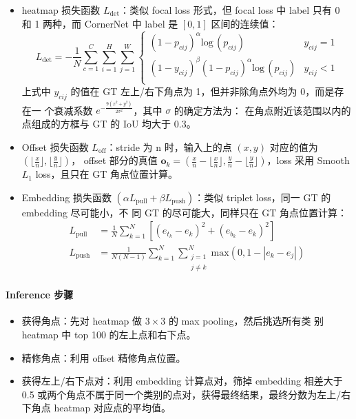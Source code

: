 \begin{itemize}
  \item heatmap 损失函数 $L_{\mathrm{det}}$：类似 focal loss 形式，但 focal loss
    中 label 只有 0 和 1 两种，而 CornerNet 中 label 是 $[0, 1]$ 区间的连续值：
    \begin{equation}
      \label{equ:cornernet-det-loss}
      L_{\mathrm{det}} = -\frac{1}{N} \sum_{c=1}^{C} \sum_{i=1}^{H} \sum_{j=1}^{W}
      \left\{
        \begin{array}{lr}
           (1-p_{cij})^{\alpha}\mathrm{log}\,(p_{cij}) & y_{cij} = 1 \\
           (1-y_{cij})^{\beta} (1-p_{cij})^{\alpha} \mathrm{log}\,(p_{cij}) & y_{cij} < 1 \\
        \end{array}
      \right.
    \end{equation}
    上式中 $y_{cij}$ 的值在 GT 左上/右下角点为 1，但并非除角点外均为 0，而是存在一
    个衰减系数 $e^{-\frac{9(x^2+y^2)}{2\sigma^2}}$，其中 $\sigma$ 的确定方法为：
    在角点附近该范围以内的点组成的方框与 GT 的 IoU 均大于 0.3。
  \item Offset 损失函数 $L_{\mathrm{off}}$：stride 为 n 时，输入上的点 $(x, y)$
    对应的值为 $( \lfloor \frac{x}{n} \rfloor, \lfloor \frac{y}{n} \rfloor)$，
    offset 部分的真值 $\mathbf{o}_k = \left( \frac{x}{n} - \lfloor \frac{x}{n}
      \rfloor, \frac{y}{n} - \lfloor \frac{y}{n} \rfloor \right)$，loss 采用
    Smooth $L_1$ loss，且只在 GT 角点位置计算。
  \item Embedding 损失函数 $(\alpha L_{\mathrm{pull}} + \beta
    L_{\mathrm{push}})$：类似 triplet loss，同一 GT 的 embedding 尽可能小，不
    同 GT 的尽可能大，同样只在 GT 角点位置计算：
    \begin{align}
      \label{equ:cornernet-em-loss-pull}
      L_{\mathrm{pull}} & = \frac{1}{N} \sum_{k=1}^{N} \left[ (e_{t_k} - e_k)^2 + (e_{b_k} - e_k)^2 \right] \\
      \label{equ:cornernet-em-loss-push}
      L_{\mathrm{push}} & = \frac{1}{N(N-1)} \sum_{k=1}^{N} \sum_{\substack{j=1 \\ j \neq k}}^{N} \mathrm{max} (0, 1-|e_k-e_j|)
    \end{align}
\end{itemize}

\paragraph{Inference 步骤}
\begin{itemize}
  \item 获得角点：先对 heatmap 做 $3 \times 3$ 的 max pooling，然后挑选所有类
    别 heatmap 中 top 100 的左上点和右下点。
  \item 精修角点：利用 offset 精修角点位置。
  \item 获得左上/右下点对：利用 embedding 计算点对，筛掉 embedding 相差大于 0.5
    或两个角点不属于同一个类别的点对，获得最终结果，最终分数为左上/右下角点
    heatmap 对应点的平均值。
\end{itemize}

